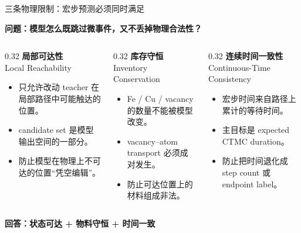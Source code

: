\documentclass[aspectratio=43,10pt]{beamer}
\newcommand{\hl}[1]{\textcolor{thuPurple}{\textbf{#1}}}
\newcommand{\tightitems}{\setlength{\itemsep}{0.35em}}
\begin{document}
\begin{frame}{三条物理限制：宏步预测必须同时满足}
  \small
  \begin{center}
    \normalsize \hl{问题：模型怎么既跳过微事件，又不丢掉物理合法性？}
  \end{center}
  \vspace{0.25cm}
  \begin{columns}[T,onlytextwidth]
    \begin{column}{0.32\textwidth}
      \textbf{局部可达性}\\[-0.1em]
      {\scriptsize Local Reachability}
      \begin{itemize}
        \tightitems
        \item 只允许改动 teacher 在局部路径中可能触达的位置。
        \item candidate set 是模型输出空间的一部分。
        \item 防止模型在物理上不可达的位置“凭空编辑”。
      \end{itemize}
    \end{column}
    \begin{column}{0.32\textwidth}
      \textbf{库存守恒}\\[-0.1em]
      {\scriptsize Inventory Conservation}
      \begin{itemize}
        \tightitems
        \item Fe / Cu / vacancy 的数量不能被模型改变。
        \item vacancy--atom transport 必须成对发生。
        \item 防止可达位置上的材料组成非法。
      \end{itemize}
    \end{column}
    \begin{column}{0.32\textwidth}
      \textbf{连续时间一致性}\\[-0.1em]
      {\scriptsize Continuous-Time Consistency}
      \begin{itemize}
        \tightitems
        \item 宏步时间来自路径上累计的等待时间。
        \item 主目标是 expected CTMC duration。
        \item 防止把时间退化成 step count 或 endpoint label。
      \end{itemize}
    \end{column}
  \end{columns}
  \vspace{0.35cm}
  \begin{center}
    \large \hl{回答：状态可达 + 物料守恒 + 时间一致}
  \end{center}
\end{frame}
\end{document}
